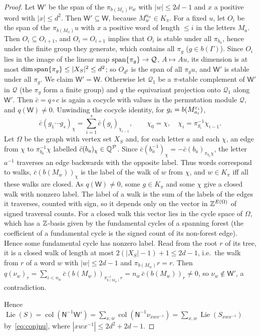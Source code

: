 \begin{proof}
Let $\mathsf W'$ be the span of the $\pi_{b(M_x)}\nu_w$ with $|w|\le2d-1$ and $x$ a positive word with $|x|\le d^2$. Then
$\mathsf W'\subseteq\mathsf W$, because $M_w^{n_w}\in K_\pi$. For a fixed $u$, let $O_i$ be the span of the
$\pi_{b(M_x)}u$ with $x$ a positive word of length $\le i$ in the letters $M_a$. Then $O_i\subseteq O_{i+1}$,
and $O_i=O_{i+1}$ implies that $O_i$ is stable under all $\pi_{b_a}$, hence under the finite group they
generate, which contains all $\pi_g$ ($g\in b(\Gamma)$). Since $O_i$ lies in the image of the linear map
$\operatorname{span}\{\pi_g\}\to\mathcal Q$, $A\mapsto Au$, its dimension is at most $\dim\operatorname{span}\{\pi_g\}\le|X_S|^2\le d^2$;
so $O_{d^2}$ is the span of all $\pi_gu$, and $\mathsf W'$ is stable under all $\pi_g$. We claim
$\mathsf W'=\mathsf W$. Otherwise let $\mathcal Q_1$ be a $\pi$-stable complement of $\mathsf W'$ in $\mathcal Q$
(the $\pi_g$ form a finite group) and $q$ the equivariant projection onto $\mathcal Q_1$ along $\mathsf W'$.
Then $\bar c=q\circ c$ is again a cocycle with values in the permutation module $\mathcal Q$, and
$q(\mathsf W)\ne0$. Unwinding the cocycle identity,
for $g_i=b(M_{a_i}^{\varepsilon_i})$,
\[
\bar c(g_1\cdots g_s)_\chi=\sum_{i=1}^s\bar c(g_i)_{\chi_{i-1}},\qquad\chi_0=\chi,\quad
\chi_i=\pi_{g_i}^{-1}\chi_{i-1}.
\]
Let $\Omega$ be the graph with vertex set $X_S$ and, for each letter $a$ and each $\chi$, an edge from
$\chi$ to $\pi_{b_a}^{-1}\chi$ labelled $\bar c(b_a)_\chi\in\mathbb{Q}^{\mathcal P}$. Since
$\bar c(b_a^{-1})_\chi=-\bar c(b_a)_{\pi_{b_a}\chi}$, the letter $a^{-1}$ traverses an edge backwards
with the opposite label. Thus words correspond to walks, $\bar c(b(M_w))_\chi$ is the label of the walk
of $w$ from $\chi$, and $w\in K_\pi$ iff all these walks are closed. As $q(\mathsf W)\ne0$, some $g\in K_\pi$
and some $\chi$ give a closed walk with nonzero label. The label of a walk is the sum of the labels of the
edges it traverses, counted with sign, so it depends only on the vector in $\mathbb{Z}^{E(\Omega)}$ of signed
traversal counts. For a closed walk this vector lies in the cycle space of $\Omega$, which has a
$\mathbb{Z}$-basis given by the fundamental cycles of a spanning forest (the coefficient of a fundamental cycle
is the signed count of its non-forest edge). Hence some fundamental cycle has nonzero label. Read from the root $r$ of its tree, it is a closed walk of length at most $2(|X_S|-1)+1\le2d-1$,
i.e.\ the walk from $r$ of a word $w$ with $|w|\le2d-1$ and $\pi_{b(M_w)}r=r$. Then
$q(\nu_w)_r=\sum_{i<n_w}\bar c(b(M_w))_{\pi^{-i}_{b(M_w)}r}=n_w\,\bar c(b(M_w))_r\ne0$, so
$\nu_w\notin\mathsf W'$, a contradiction.

Hence $\operatorname{Lie}(S)=\operatorname{col}(\mathsf N^{-1}\mathsf W')=\sum_{x,w}\operatorname{col}(\mathsf N^{-1}\nu_{xwx^{-1}})
=\sum_{x,w}\operatorname{Lie}(S_{xwx^{-1}})$ by~\eqref{eq:conjnu}, where $|xwx^{-1}|\le2d^2+2d-1$.
\end{proof}

